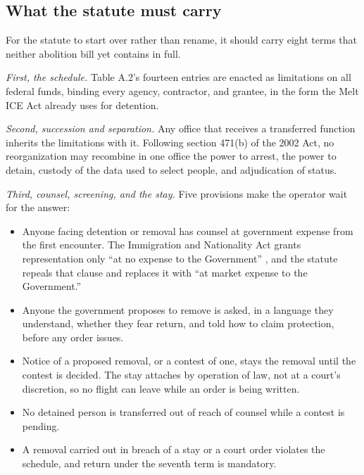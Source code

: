 \subsection{What the statute must carry}
\label{sec:11.4.3}
For the statute to start over rather than rename, it should carry eight terms that neither abolition bill yet contains in full.

\emph{First, the schedule.} Table A.2's fourteen entries are enacted as limitations on all federal funds, binding every agency, contractor, and grantee, in the form the Melt ICE Act already uses for detention.

\emph{Second, succession and separation.} Any office that receives a transferred function inherits the limitations with it. Following section 471(b) of the 2002 Act, no reorganization may recombine in one office the power to arrest, the power to detain, custody of the data used to select people, and adjudication of status.

\emph{Third, counsel, screening, and the stay.} Five provisions make the operator wait for the answer:

\begin{itemize}
\item Anyone facing detention or removal has counsel at government expense from the first encounter. The Immigration and Nationality Act grants representation only “at no expense to the Government” \autocite{usc1362}, and the statute repeals that clause and replaces it with “at market expense to the Government.”
\item Anyone the government proposes to remove is asked, in a language they understand, whether they fear return, and told how to claim protection, before any order issues.
\item Notice of a proposed removal, or a contest of one, stays the removal until the contest is decided. The stay attaches by operation of law, not at a court's discretion, so no flight can leave while an order is being written.
\item No detained person is transferred out of reach of counsel while a contest is pending.
\item A removal carried out in breach of a stay or a court order violates the schedule, and return under the seventh term is mandatory.
\end{itemize}

